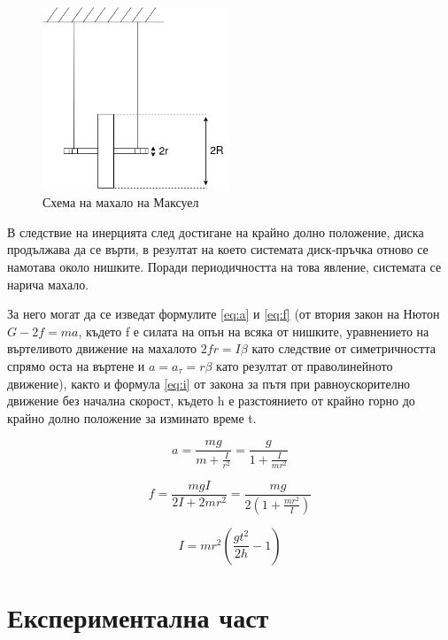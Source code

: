 \documentclass[12pt]{article}
\begin{document}
\begin{figure}
    \centering
    \includegraphics[width=0.5\textwidth]{images/Maxwells Penundulum.png}
    \caption{Схема на махало на Максуел}
    \label{fig:setup}
\end{figure}

В следствие на инерцията след достигане на крайно долно положение, диска продължава да се върти, в резултат на което системата диск-пръчка отново се намотава около нишките. Поради периодичността на това явление, системата се нарича махало.

За него могат да се изведат формулите \ref{eq:a} и \ref{eq:f} (от втория закон на Нютон $G - 2f = ma$, където f е силата на опън на всяка от нишките, уравнението на въртеливото движение на махалото $2fr = I\beta$ като следствие от симетричността спрямо оста на въртене и $a = a_\tau = r \beta$ като резултат от праволинейното движение), както и формула \ref{eq:i} от закона за пътя при равноускорително движение без начална скорост, където h е разстоянието от крайно горно до крайно долно положение за изминато време t.

\begin{equation}\label{eq:a}
    a = \frac{mg}{m + \frac{I}{r^2}} = \frac{g}{1 + \frac{I}{mr^2}}
\end{equation}

\begin{equation}\label{eq:f}
    f = \frac{mgI}{2I + 2mr^2} = \frac{mg}{2(1 + \frac{mr^2}{I})}
\end{equation}

\begin{equation}\label{eq:i}
    I = mr^2\left(\frac{gt^2}{2h} - 1\right)
\end{equation}

\section{Експериментална част}
\end{document}
